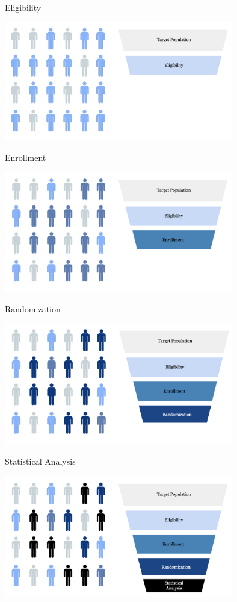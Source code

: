 \documentclass[english]{beamer}\usepackage[]{graphicx}\usepackage[]{xcolor}
\begin{document}
\begin{frame}{Eligibility}

\includegraphics[width=100mm,scale=1]{eligibility.png}

\end{frame}

\begin{frame}{Enrollment}

\includegraphics[width=100mm,scale=1]{enrollment.png}


\end{frame}

\begin{frame}{Randomization}

\includegraphics[width=100mm,scale=1]{randomization.png}

\end{frame}

\begin{frame}{Statistical Analysis}

\includegraphics[width=100mm,scale=1]{statanal.png}

\end{frame}
\end{document}
